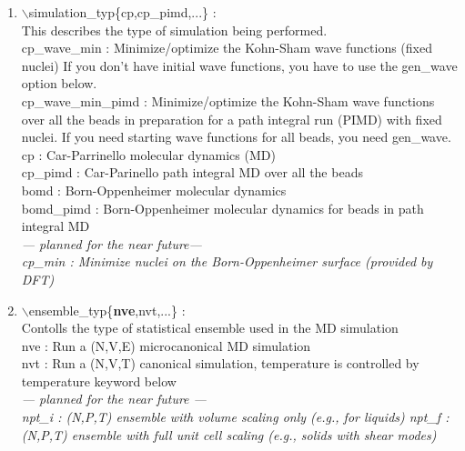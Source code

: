 \documentclass[12pt,titlepage]{article}
\begin{document}
\begin{enumerate}
 \vspace{0.15in}
 \item $\backslash$simulation\_typ\{cp,cp\_pimd,...\} : \\
     This describes the type of simulation being performed.\\
     cp\_wave\_min : Minimize/optimize the Kohn-Sham wave functions (fixed nuclei)
              If you don't have initial wave functions, you have to
	      use the gen\_wave option below.\\
cp\_wave\_min\_pimd : Minimize/optimize the Kohn-Sham wave functions
		   over all the beads in preparation for a path
		   integral run (PIMD) with fixed nuclei.  If you need
		   starting wave functions for all beads, you need gen\_wave.\\
cp : Car-Parrinello molecular dynamics (MD)\\
cp\_pimd : Car-Parinello path integral MD over all the beads\\
bomd : Born-Oppenheimer molecular dynamics\\
bomd\_pimd : Born-Oppenheimer molecular dynamics for beads in path integral MD\\
{\it
--- planned for the near future---\\
cp\_min : Minimize nuclei on the Born-Oppenheimer surface (provided by DFT)
}
 

 \vspace{0.15in} 
 \item  $\backslash$ensemble\_typ\{{\bf nve},nvt,...\} : \\
Contolls the type of statistical ensemble used in the MD simulation\\
nve : Run a (N,V,E) microcanonical MD simulation\\
nvt : Run a (N,V,T) canonical simulation, temperature is controlled by 
      temperature keyword below\\
{\it
--- planned for the near future ---\\
npt\_i : (N,P,T) ensemble with volume scaling only (e.g., for liquids)
npt\_f : (N,P,T) ensemble with full unit cell scaling  (e.g., solids
        with shear modes)
}



\end{enumerate}
\end{document}
